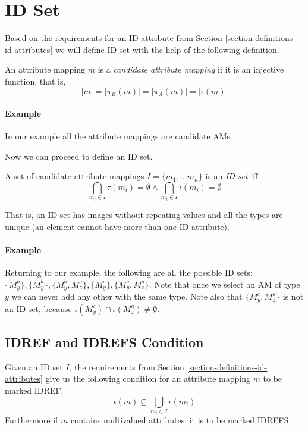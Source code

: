\section{ID Set}
\label{section-definitions-id-set}

Based on the requirements for an ID attribute from Section \ref{section-definitions-id-attributes} we will define ID set with the help of the following definition.

\begin{define}
An attribute mapping $m$ is a \textit{candidate attribute mapping} if it is an injective function, that is,
\[|m| = |\pi_E(m)| = |\pi_A(m)| = |\iota(m)|\]
\end{define}

\paragraph{Example}
In our example all the attribute mappings are candidate AMs.

Now we can proceed to define an ID set.

\begin{define}[ID set]
A set of candidate attribute mappings $I = \{m_1, \ldots m_n\}$ is an \textit{ID set} iff
\[\bigcap_{m_i \in I} \tau(m_i) = \emptyset \wedge \bigcap_{m_i \in I} \iota(m_i) = \emptyset\]
\end{define}

That is, an ID set has images without repeating values and all the types are unique (an element cannot have more than one ID attribute).

\paragraph{Example}
Returning to our example, the following are all the possible ID sets: $\{ M_{y}^{a} \}, \{ M_{y}^{b} \}, \{ M_{y}^{b}, M_{z}^{a} \}, \{ M_{y}^{c} \}, \{ M_{y}^{c}, M_{z}^{a} \}$. Note that once we select an AM of type $y$ we can never add any other with the same type. Note also that $\{ M_{y}^{c}, M_{z}^{a} \}$ is not an ID set, because $\iota(M_{y}^{c}) \cap \iota(M_{z}^{a}) \neq \emptyset$.

\subsection{IDREF and IDREFS Condition}

Given an ID set $I$, the requirements from Section \ref{section-definitions-id-attributes} give us the following condition for an attribute mapping $m$ to be marked IDREF.
\[\iota(m) \subseteq \bigcup_{m_i \in I} \iota(m_i)\]
Furthermore if $m$ contains multivalued attributes, it is to be marked IDREFS.

